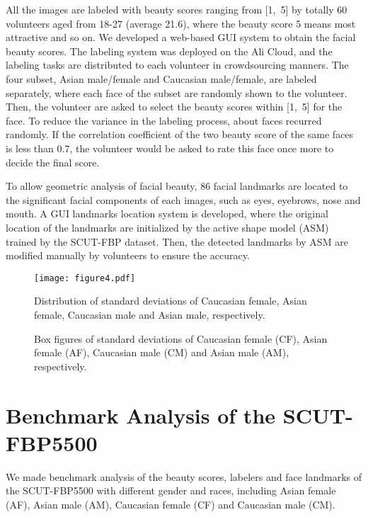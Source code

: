 \documentclass[10pt,conference,a4paper]{IEEEtran}
\begin{document}
All the images are labeled with beauty scores ranging from [1,~5] by totally 60 volunteers aged from 18-27 (average 21.6), where the beauty score 5 means most attractive and so on. We developed a web-based GUI system to obtain the facial beauty scores. The labeling system was deployed on the Ali Cloud, and the labeling tasks are distributed to each volunteer in crowdsourcing manners. The four subset, Asian male/female and Caucasian male/female, are labeled separately, where each face of the subset are randomly shown to the volunteer. Then, the volunteer are asked to select the beauty scores within [1,~5] for the face. To reduce the variance in the labeling process, about  faces recurred randomly. If the correlation coefficient of the two beauty score of the same faces is less than 0.7, the volunteer would be asked to rate this face once more to decide the final score.

To allow geometric analysis of facial beauty, 86 facial landmarks are located to the significant facial components of each images, such as eyes, eyebrows, nose and mouth. A GUI landmarks location system is developed, where the original location of the landmarks are initialized by the active shape model (ASM) trained by the SCUT-FBP dataset. Then, the detected landmarks by ASM are modified manually by volunteers to ensure the accuracy.








\begin{figure}[!t]
\centering
\texttt{[image: figure4.pdf]}
\caption{Distribution of standard deviations of Caucasian female, Asian female, Caucasian male and Asian male, respectively.}
\label{fig_deviation}
\end{figure}

\begin{figure}[!t]
\centering
{}

\caption{Box figures of standard deviations of Caucasian female (CF), Asian female (AF), Caucasian male (CM) and Asian male (AM), respectively.}
\label{fig_deviation2}
\end{figure}

\section{Benchmark Analysis of the SCUT-FBP5500}
We made benchmark analysis of the beauty scores, labelers and face landmarks of the SCUT-FBP5500 with different gender and races, including Asian female (AF), Asian male (AM), Caucasian female (CF) and Caucasian male (CM).
\end{document}
